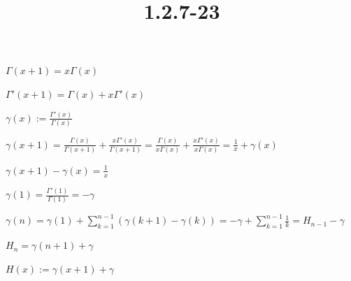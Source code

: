 \documentclass{article}
\title{1.2.7-23}
\begin{document}
\maketitle

\( \Gamma(x+1) = x \Gamma(x) \)

\( \Gamma'(x+1) = \Gamma(x) + x\Gamma'(x) \)

\( \gamma(x) := \frac{\Gamma'(x)}{\Gamma(x)} \)

\( \gamma(x+1) = \frac{\Gamma(x)}{\Gamma(x+1)} + \frac{x\Gamma'(x)}{\Gamma(x+1)} = \frac{\Gamma(x)}{x\Gamma(x)} + \frac{x\Gamma'(x)}{x\Gamma(x)} = \frac{1}{x} + \gamma(x) \)

\( \gamma(x + 1) - \gamma(x) = \frac{1}{x} \)

\( \gamma(1) = \frac{\Gamma'(1)}{\Gamma(1)} = -\gamma \)

\( \gamma(n) = \gamma(1) + \sum_{k=1}^{n-1} (\gamma(k+1) - \gamma(k)) = -\gamma + \sum_{k=1}^{n-1} \frac{1}{k} = H_{n-1} - \gamma \)

\( H_n = \gamma(n+1) + \gamma \)

\( H(x) := \gamma(x+1) + \gamma \)
\end{document}
